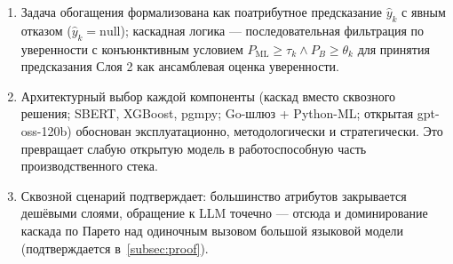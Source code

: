 \begin{enumerate}[label=\arabic*)]
    \item Задача обогащения формализована как поатрибутное предсказание $\hat{y}_k$ с явным отказом ($\hat{y}_k = \text{null}$); каскадная логика — последовательная фильтрация по уверенности с конъюнктивным условием $P_{\text{ML}} \geq \tau_k \wedge P_B \geq \theta_k$ для принятия предсказания Слоя 2 как ансамблевая оценка уверенности.
    \item Архитектурный выбор каждой компоненты (каскад вместо сквозного решения; SBERT, XGBoost, pgmpy; Go-шлюз + Python-ML; открытая gpt-oss-120b) обоснован эксплуатационно, методологически и стратегически. Это превращает слабую открытую модель в работоспособную часть производственного стека.
    \item Сквозной сценарий подтверждает: большинство атрибутов закрывается дешёвыми слоями, обращение к LLM точечно — отсюда и доминирование каскада по Парето над одиночным вызовом большой языковой модели (подтверждается в~\ref{subsec:proof}).
\end{enumerate}
